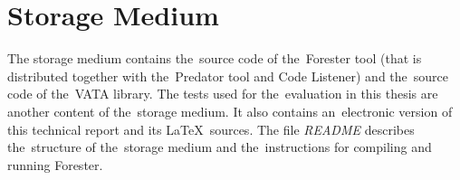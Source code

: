 \chapter{Storage Medium}
The storage medium contains the~source code of
the~Forester tool (that is distributed together with the~Predator tool
and Code Listener)
and the~source code of the~VATA library.
The tests used for the~evaluation in this thesis are
another content of the~storage medium.
It also contains an~electronic version of this technical report
and its \LaTeX\ sources.
The file \emph{README} describes the~structure
of the~storage medium and the~instructions for compiling
and running Forester.

